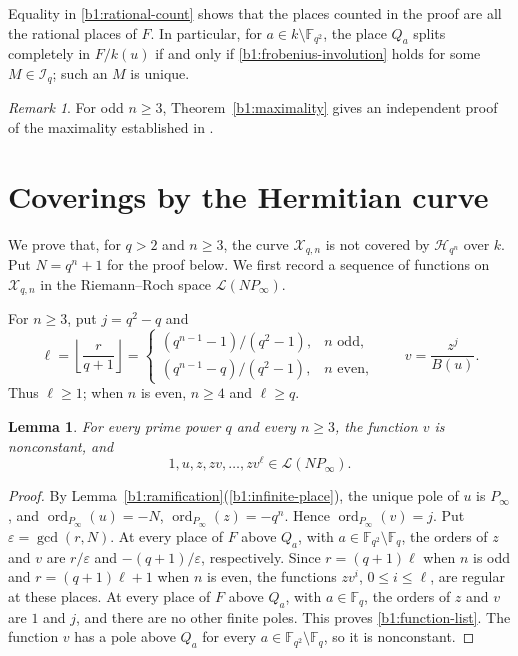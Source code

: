 \documentclass[12pt,reqno]{amsart}
\numberwithin{equation}{section}
\newcommand{\F}{\mathbb F}
\theoremstyle{plain}
\newtheorem{lemma}[theorem]{Lemma}
\theoremstyle{definition}
\theoremstyle{remark}
\newtheorem{remark}[theorem]{Remark}
\begin{document}
Equality in \eqref{b1:rational-count} shows that the places counted
in the proof are all the rational places of \(F\).
In particular, for \(a\in k\setminus\F_{q^2}\), the place \(Q_a\)
splits completely in \(F/k(u)\) if and only if
\eqref{b1:frobenius-involution} holds for some
\(M\in\mathcal I_q\); such an \(M\) is unique.

\begin{remark}
\label{b1:bm-maximality}
For odd \(n\ge3\), Theorem~\ref{b1:maximality} gives an independent
proof of the maximality established in \cite[Theorem~3.9]{BM2018}.
\end{remark}


\section{Coverings by the Hermitian curve}
\label{b1:noncover-section}

We prove that, for \(q>2\) and \(n\ge3\), the curve
\(\mathcal X_{q,n}\) is not covered by \(\mathcal H_{q^n}\) over
\(k\). Put \(N=q^n+1\) for the proof below. We first record a
sequence of functions on \(\mathcal X_{q,n}\) in the
Riemann--Roch space \(\mathcal L(NP_\infty)\).

For \(n\ge3\), put \(j=q^2-q\) and
\begin{equation}
\label{b1:ell}
 \ell=\left\lfloor\frac{r}{q+1}\right\rfloor
 =\begin{cases}
 (q^{n-1}-1)/(q^2-1),&n\text{ odd},\\
 (q^{n-1}-q)/(q^2-1),&n\text{ even},
 \end{cases}
 \qquad v=\frac{z^j}{B(u)}.
\end{equation}
Thus \(\ell\ge1\); when \(n\) is even, \(n\ge4\) and
\(\ell\ge q\).

\begin{lemma}
\label{b1:pole-functions}
For every prime power \(q\) and every \(n\ge3\), the function \(v\)
is nonconstant, and
\begin{equation}
\label{b1:function-list}
 1,u,z,zv,\ldots,zv^\ell\in\mathcal L(NP_\infty).
\end{equation}
\end{lemma}

\begin{proof}
By Lemma~\ref{b1:ramification}(\ref{b1:infinite-place}), the unique pole of \(u\) is
\(P_\infty\), and
\(\operatorname{ord}_{P_\infty}(u)=-N\),
\(\operatorname{ord}_{P_\infty}(z)=-q^n\).  Hence
\(\operatorname{ord}_{P_\infty}(v)=j\).
Put \(\varepsilon=\gcd(r,N)\). At every place of \(F\) above
\(Q_a\), with \(a\in\F_{q^2}\setminus\F_q\),
the orders of \(z\) and \(v\) are \(r/\varepsilon\) and
\(-(q+1)/\varepsilon\), respectively.  Since
\(r=(q+1)\ell\) when \(n\) is odd and
\(r=(q+1)\ell+1\) when \(n\) is even, the functions
\(zv^i\), \(0\le i\le\ell\), are regular at these places.
At every place of \(F\) above \(Q_a\), with \(a\in\F_q\), the orders of \(z\) and
\(v\) are \(1\) and \(j\), and there are no other finite poles.
This proves \eqref{b1:function-list}. The function \(v\) has a pole
above \(Q_a\) for every \(a\in\F_{q^2}\setminus\F_q\), so it is nonconstant.
\end{proof}
\end{document}
